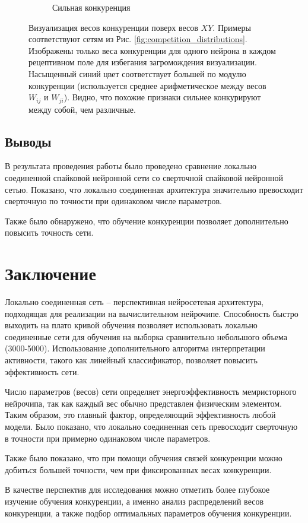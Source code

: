 \documentclass[a4paper]{article}
\begin{document}
\begin{figure}[H]
\begin{subfigure}{0.45\textwidth}
    \caption{Сильная конкуренция}
\end{subfigure} 
\caption{Визуализация весов конкуренции поверх весов $XY$. Примеры соответствуют сетям из Рис. \ref{fig:competition_distributions}. Изображены только веса конкуренции для одного нейрона в каждом рецептивном поле для избегания загромождения визуализации. Насыщенный синий цвет соответствует большей по модулю конкуренции (используется среднее арифметическое между весов $W_{ij}$ и $W_{ji}$). Видно, что похожие признаки сильнее конкурируют между собой, чем различные.}
\end{figure}

\subsection{Выводы}
В результата проведения работы было проведено сравнение локально соединенной спайковой нейронной сети со сверточной спайковой нейронной сетью. Показано, что локально соединенная архитектура значительно превосходит сверточную по точности при одинаковом числе параметров.

Также было обнаружено, что обучение конкуренции позволяет дополнительно повысить точность сети.

\clearpage

\section{Заключение}
Локально соединенная сеть – перспективная нейросетевая архитектура, подходящая для реализации на вычислительном нейрочипе. Способность быстро выходить на плато кривой обучения позволяет использовать локально соединенные сети для обучения на выборка сравнительно небольшого объема (3000-5000). Использование дополнительного алгоритма интерпретации активности, такого как линейный классификатор, позволяет повысить эффективность сети.

Число параметров (весов) сети определяет энергоэффективность мемристорного нейрочипа, так как каждый вес обычно представлен физическим элементом. Таким образом, это главный фактор, определяющий эффективность любой модели. Было показано, что локально соединенная сеть превосходит сверточную в точности при примерно одинаковом числе параметров.

Также было показано, что при помощи обучения связей конкуренции можно добиться большей точности, чем при фиксированных весах конкуренции.

В качестве перспектив для исследования можно отметить более глубокое изучение обучения конкуренции, а именно анализ распределений весов конкуренции, а также подбор оптимальных параметров обучения конкуренции.
\end{document}
